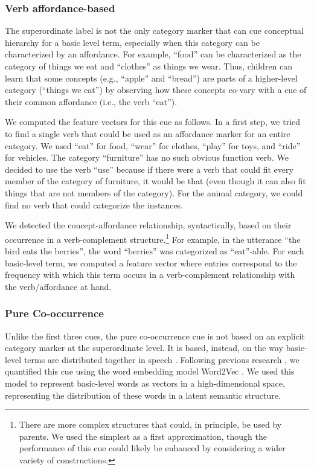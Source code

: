 \documentclass[10pt, letterpaper]{article}
\begin{document}
\hypertarget{affordance-based}{%
\subsubsection{Verb affordance-based}\label{affordance-based}}

The superordinate label is not the only category marker that can cue
conceptual hierarchy for a basic level term, especially when this
category can be characterized by an affordance. For example, ``food''
can be characterized as the category of things we eat and ``clothes'' as
things we wear. Thus, children can learn that some concepts (e.g.,
``apple'' and ``bread'') are parts of a higher-level category (``things
we eat'') by observing how these concepts co-vary with a cue of their
common affordance (i.e., the verb ``eat'').

We computed the feature vectors for this cue as follows. In a first
step, we tried to find a single verb that could be used as an affordance
marker for an entire category. We used ``eat'' for food, ``wear'' for
clothes, ``play'' for toys, and ``ride'' for vehicles. The category
``furniture'' has no such obvious function verb. We decided to use the
verb ``use'' because if there were a verb that could fit every member of
the category of furniture, it would be that (even though it can also fit
things that are not members of the category). For the animal category,
we could find no verb that could categorize the instances.

We detected the concept-affordance relationship, syntactically, based on
their occurrence in a verb-complement
structure.\footnote{There are more complex structures that could, in principle, be used by parents. We used the simplest as a first approximation, though the performance of this cue could likely be enhanced by considering a wider variety of constructions.}
For example, in the utterance ``the bird eats the berries'', the word
``berries'' was categorized as ``eat''-able. For each basic-level term,
we computed a feature vector where entries correspond to the frequency
with which this term occurs in a verb-complement relationship with the
verb/affordance at hand.

\hypertarget{pure-co-occurrence}{%
\subsubsection{Pure Co-occurrence}\label{pure-co-occurrence}}

Unlike the first three cues, the pure co-occurrence cue is not based on
an explicit category marker at the superordinate level. It is based,
instead, on the way basic-level terms are distributed together in speech
\cite{harris1957}. Following previous
research \cite{fourtassi2019}, we quantified this cue using the word
embedding model Word2Vec \cite{mikolov2013}. We used this model to
represent basic-level words as vectors in a high-dimensional space,
representing the distribution of these words in a latent semantic
structure.
\end{document}
